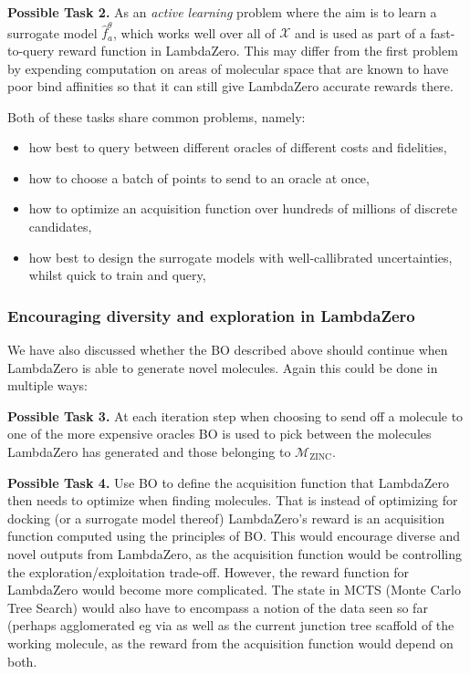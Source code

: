 \documentclass{article}
\begin{document}
\vspace{0.1cm}
\noindent
\textbf{Possible Task 2.} As an \emph{active learning} \citep{pinsler2019bayesian, kirsch2019batchbald} problem where the aim is to learn a surrogate model
$\hat{f}^\theta_a$, which works well over all of $\mathcal{X}$ and is used as part of a fast-to-query reward function in LambdaZero.
This may differ from the first problem by expending computation on areas of molecular space that are known to have poor bind affinities 
so that it can still give LambdaZero accurate rewards there.


\vspace{1cm}
Both of these tasks share common problems, namely:
\begin{itemize} 
  \item how best to query between different oracles of different costs and fidelities,
  \item how to choose a batch of points to send to an oracle at once,
  \item how to optimize an acquisition function over hundreds of millions of discrete candidates,
  \item how best to design the surrogate models with well-callibrated uncertainties, whilst quick to train and query,
\end{itemize}


\subsubsection{Encouraging diversity and exploration in LambdaZero}
We have also discussed whether the BO described above should continue when LambdaZero is able to generate novel molecules. 
Again this could be done in multiple ways:

\vspace{0.1cm}
\noindent
\textbf{Possible Task 3.} At each iteration step when choosing to send off a molecule to one of the more expensive oracles BO is used to pick
between the molecules LambdaZero has generated and those belonging to $\mathcal{M}_{\textrm{ZINC}}$.

\vspace{0.1cm}
\noindent
\textbf{Possible Task 4.} Use BO to define the acquisition function that LambdaZero then needs to optimize when finding molecules. 
That is instead of optimizing for docking (or a surrogate model thereof) LambdaZero's reward is an acquisition function 
computed using the principles of BO.
This would encourage diverse and novel outputs from LambdaZero, as the acquisition function would be controlling
the exploration/exploitation trade-off.
However, the reward function for LambdaZero would become more complicated.
The state in MCTS (Monte Carlo Tree Search) would also have to encompass a notion of the data seen so far
(perhaps agglomerated eg via \citep{NIPS2017_6931, skianis2019rep}
as well as the current
junction tree scaffold of the working molecule, as the reward from the acquisition function would depend on both.
\end{document}
